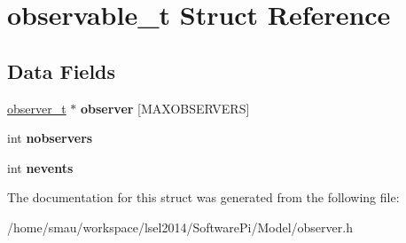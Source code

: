 \hypertarget{structobservable__t}{\section{observable\-\_\-t Struct Reference}
\label{structobservable__t}
}
\subsection*{Data Fields}
\begin{DoxyCompactItemize}
\item 
\hypertarget{structobservable__t_a443331494d273fad00163825b7a4a4a7}{\hyperlink{structobserver__t}{observer\-\_\-t} $\ast$ {\bfseries observer} \mbox{[}M\-A\-X\-O\-B\-S\-E\-R\-V\-E\-R\-S\mbox{]}}\label{structobservable__t_a443331494d273fad00163825b7a4a4a7}

\item 
\hypertarget{structobservable__t_a75941e23dfb69ea33f5f673dea8366e8}{int {\bfseries nobservers}}\label{structobservable__t_a75941e23dfb69ea33f5f673dea8366e8}

\item 
\hypertarget{structobservable__t_a0e8a5b135480ad85a11553d1bcc84afd}{int {\bfseries nevents}}\label{structobservable__t_a0e8a5b135480ad85a11553d1bcc84afd}

\end{DoxyCompactItemize}


The documentation for this struct was generated from the following file\-:\begin{DoxyCompactItemize}
\item 
/home/smau/workspace/lsel2014/\-Software\-Pi/\-Model/observer.\-h\end{DoxyCompactItemize}
